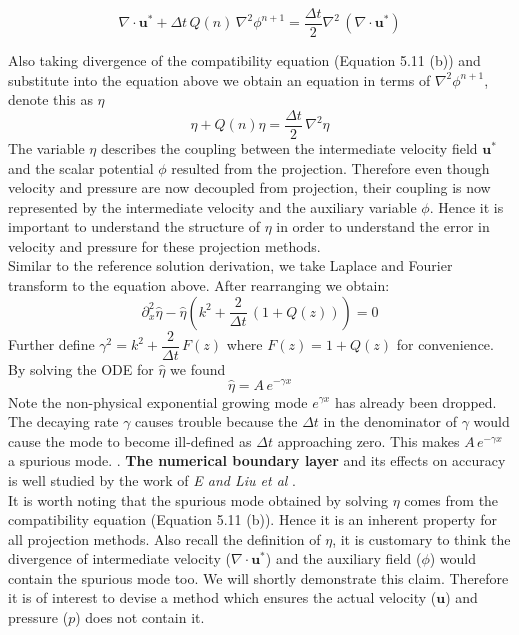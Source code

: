\begin{equation}
\nabla \cdot \textbf{u}^* + \Delta t \,Q(n)\,\nabla^2 \phi^{n+1} = \dfrac{\Delta t}{2} \nabla^2 \,(\nabla \cdot \textbf{u}^*)
\end{equation}

Also taking divergence of the compatibility equation (Equation 5.11 (b)) and substitute into the equation above we obtain an equation in terms of $\nabla^2\phi^{n+1}$, denote this as $\eta$
\begin{equation*}
\eta + Q(n)\eta = \dfrac{\Delta t}{2}\, \nabla^2 \eta
\end{equation*}
The variable $\eta$ describes the coupling between the intermediate velocity field $\textbf{u}^*$ and the scalar potential $\phi$ resulted from the projection. Therefore even though velocity and pressure are now decoupled from projection, their coupling is now represented by the intermediate velocity and the auxiliary variable $\phi$. Hence it is important to understand the structure of $\eta$ in order to understand the error in velocity and pressure for these projection methods.\\

Similar to the reference solution derivation, we take Laplace and Fourier transform to the equation above. After rearranging we obtain:
\begin{equation}
\partial_x^2 \hat{\eta} - \hat{\eta} (k^2 + \dfrac{2}{\Delta t}\,(1+Q(z))) = 0
\end{equation}
Further define $\gamma^2 = k^2 + \dfrac{2}{\Delta t}\,F(z)$ where $F(z) = 1 + Q(z)$ for convenience.\\
By solving the ODE for $\hat{\eta}$ we found
\begin{equation}
\hat{\eta} = A\,e^{-\gamma x}
\end{equation}
Note the non-physical exponential growing mode $e^{\gamma x}$ has already been dropped.\\

The decaying rate $\gamma$ causes trouble because the $\Delta t$ in the denominator of $\gamma$ would cause the mode to become ill-defined as $\Delta t$ approaching zero. This makes $A\,e^{-\gamma x}$ a spurious mode. \cite{brown2001accurate, strikwerda1999accuracy}. \textbf{The numerical boundary layer} and its effects on accuracy is well studied by the work of \emph{E and Liu et al} \cite{liu1996projection}. \\
It is worth noting that the spurious mode obtained by solving $\eta$ comes from the compatibility equation (Equation 5.11 (b)). Hence it is an inherent property for all projection methods. Also recall the definition of $\eta$, it is customary to think the divergence of intermediate velocity ($\nabla \cdot \textbf{u}^*$) and the auxiliary field ($\phi$) would contain the spurious mode too. We will shortly demonstrate this claim. Therefore it is of interest to devise a method which ensures the actual velocity ($\textbf{u}$) and pressure ($p$) does not contain it. \\

